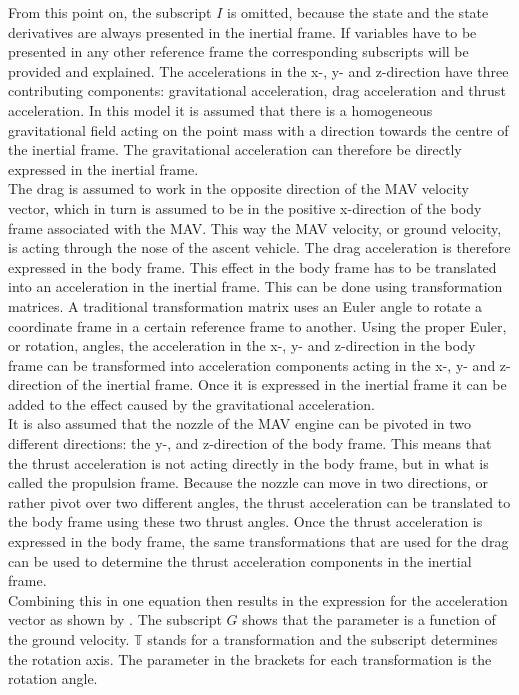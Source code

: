 From this point on, the subscript $I$ is omitted, because the state and the state derivatives are always presented in the inertial frame. If variables have to be presented in any other reference frame the corresponding subscripts will be provided and explained. The accelerations in the x-, y- and z-direction have three contributing components: gravitational acceleration, drag acceleration and thrust acceleration. In this model it is assumed that there is a homogeneous gravitational field acting on the point mass with a direction towards the centre of the inertial frame. The gravitational acceleration can therefore be directly expressed in the inertial frame. \\
The drag is assumed to work in the opposite direction of the \ac{MAV} velocity vector, which in turn is assumed to be in the positive x-direction of the body frame associated with the \ac{MAV}. This way the \ac{MAV} velocity, or ground velocity, is acting through the nose of the ascent vehicle. The drag acceleration is therefore expressed in the body frame. This effect in the body frame has to be translated into an acceleration in the inertial frame. This can be done using transformation matrices. A traditional transformation matrix uses an Euler angle to rotate a coordinate frame in a certain reference frame to another. Using the proper Euler, or rotation, angles, the acceleration in the x-, y- and z-direction in the body frame can be transformed into acceleration components acting in the x-, y- and z-direction of the inertial frame. Once it is expressed in the inertial frame it can be added to the effect caused by the gravitational acceleration. \\
It is also assumed that the nozzle of the \ac{MAV} engine can be pivoted in two different directions: the y-, and z-direction of the body frame. This means that the thrust acceleration is not acting directly in the body frame, but in what is called the propulsion frame. Because the nozzle can move in two directions, or rather pivot over two different angles, the thrust acceleration can be translated to the body frame using these two thrust angles. Once the thrust acceleration is expressed in the body frame, the same transformations that are used for the drag can be used to determine the thrust acceleration components in the inertial frame. \\

Combining this in one equation then results in the expression for the acceleration vector as shown by . The subscript $G$ shows that the parameter is a function of the ground velocity. $\mathbb{T}$ stands for a transformation and the subscript determines the rotation axis. The parameter in the brackets for each transformation is the rotation angle. 

